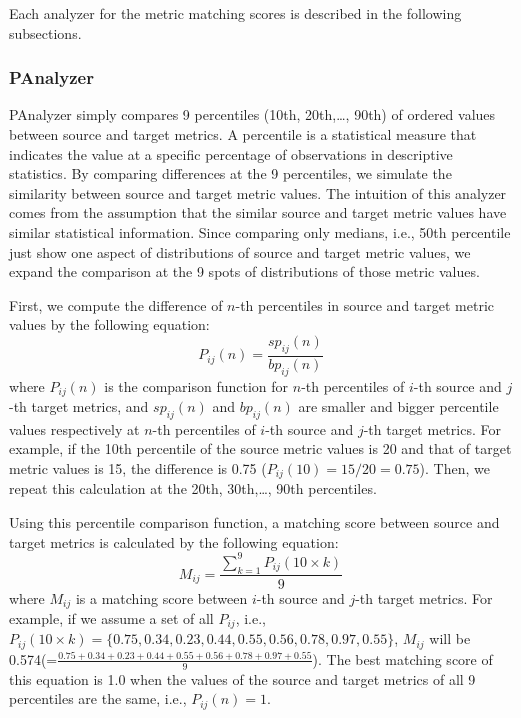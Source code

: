 
Each analyzer for the metric matching scores is described in the following subsections.

\subsubsection{PAnalyzer}
PAnalyzer simply compares 9 percentiles (10th, 20th,\ldots, 90th) of ordered
values between source and target metrics. A percentile is a statistical measure that indicates the value at a specific percentage of observations in descriptive statistics. By comparing differences at the 9 percentiles, we simulate the similarity between source and target metric values. The intuition of this analyzer comes from the assumption that the similar source and target metric values have similar statistical information. Since comparing only medians, i.e., 50th percentile just show one aspect of distributions of source and target metric values, we expand the comparison at the 9 spots of distributions of those metric values.

First, we compute the difference of $n$-th
percentiles in source and target metric values by the following
equation:
\begin{equation}
P_{ij}(n)=\frac{sp_{ij}(n)}{bp_{ij}(n)}
\end{equation}
where $P_{ij}(n)$ is the comparison function for $n$-th percentiles
of $i$-th source and $j$-th target metrics, and $sp_{ij}(n)$ and $bp_{ij}(n)$
are smaller and bigger percentile values respectively at $n$-th percentiles
of $i$-th source and $j$-th target metrics. For example, if the 10th
percentile of the source metric values is 20 and that of target metric values is
15, the difference is 0.75 ($P_{ij}(10)=15/20=0.75$). Then, we repeat this calculation at the 20th, 30th,\ldots, 90th percentiles.

Using this percentile comparison function, a matching score between source
and target metrics is calculated by the following equation:
\begin{equation}
M_{ij}=\frac{\sum\limits_{k=1}^9
P_{ij}(10\times{k})}{9}\end{equation}
where $M_{ij}$ is a matching score between $i$-th source and $j$-th
target metrics. For example, if we assume a set of all $P_{ij}$, i.e., $P_{ij}{(10\times{k})}=\{0.75, 0.34, 0.23, 0.44, 0.55, 0.56, 0.78, 0.97, 0.55\}$, $M_{ij}$ will be 0.574(=$\frac{0.75+0.34+0.23+0.44+0.55+0.56+0.78+0.97+0.55}{9}$). The best matching score of this equation is 1.0
when the values of the source and target metrics of all 9 percentiles are the
same, i.e., $P_{ij}(n)=1$.

